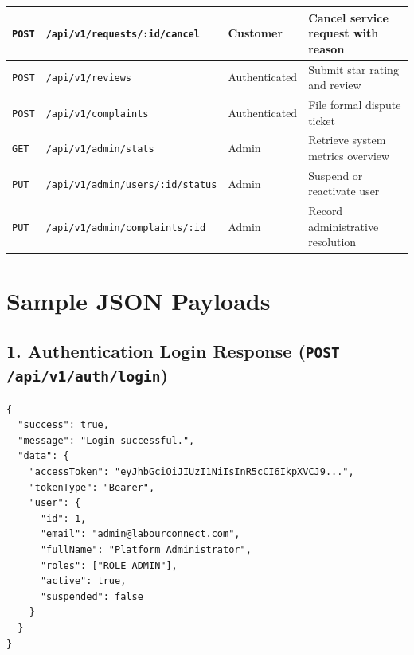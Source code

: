 \begin{table}[h!]
\begin{tabular}{|l|l|l|l|}
\texttt{POST} & \texttt{/api/v1/requests/:id/cancel} & Customer & Cancel service request with reason \\ \hline
\texttt{POST} & \texttt{/api/v1/reviews} & Authenticated & Submit star rating and review \\ \hline
\texttt{POST} & \texttt{/api/v1/complaints} & Authenticated & File formal dispute ticket \\ \hline
\texttt{GET} & \texttt{/api/v1/admin/stats} & Admin & Retrieve system metrics overview \\ \hline
\texttt{PUT} & \texttt{/api/v1/admin/users/:id/status} & Admin & Suspend or reactivate user \\ \hline
\texttt{PUT} & \texttt{/api/v1/admin/complaints/:id} & Admin & Record administrative resolution \\ \hline
\end{tabular}
\end{table}

\section*{Sample JSON Payloads}
\subsection*{1. Authentication Login Response (\texttt{POST /api/v1/auth/login})}
\begin{verbatim}
{
  "success": true,
  "message": "Login successful.",
  "data": {
    "accessToken": "eyJhbGciOiJIUzI1NiIsInR5cCI6IkpXVCJ9...",
    "tokenType": "Bearer",
    "user": {
      "id": 1,
      "email": "admin@labourconnect.com",
      "fullName": "Platform Administrator",
      "roles": ["ROLE_ADMIN"],
      "active": true,
      "suspended": false
    }
  }
}
\end{verbatim}

